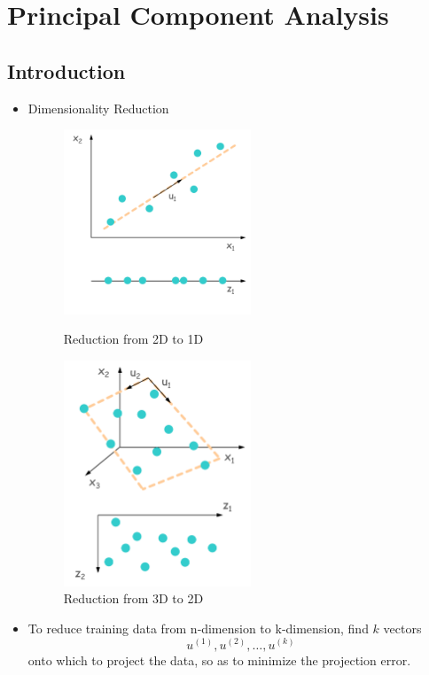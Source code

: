 \chapter{Principal Component Analysis}


\section{Introduction}
\begin{itemize}
    \item Dimensionality Reduction

    \begin{figure}[!htbp]
        \begin{minipage}[t]{0.45\textwidth}
            \centering
            \includegraphics[width=2.2in]{./images/dimensionalityReduction2D.png}
            \caption{Reduction from 2D to 1D}
        \end{minipage}
        \begin{minipage}[t]{0.45\textwidth}
            \centering
            \includegraphics[width=2.2in]{./images/dimensionalityReduction3D.png}
            \caption{Reduction from 3D to 2D}
        \end{minipage}
    \end{figure}

    \item To reduce training data from n­‐dimension to k­‐dimension, find $k$ vectors
    \begin{equation}
        u^{(1)}, u^{(2)}, \dots, u^{(k)}
    \end{equation}
    onto which to project the data, so as to minimize the projection error.


\end{itemize}

